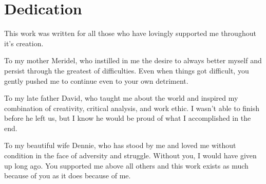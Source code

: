 \onehalfspacing
\chapter*{Dedication}
	This work was written for all those who have lovingly supported me throughout it's creation.

	To my mother Meridel, who instilled in me the desire to always better myself and persist through the greatest of difficulties. Even when things got difficult, you gently pushed me to continue even to your own detriment.

	To my late father David, who taught me about the world and inspired my combination of creativity, critical analysis, and work ethic. I wasn't able to finish before he left us, but I know he would be proud of what I accomplished in the end.

	To my beautiful wife Dennie, who has stood by me and loved me without condition in the face of adversity and struggle. Without you, I would have given up long ago. You supported me above all others and this work exists as much because of you as it does because of me.